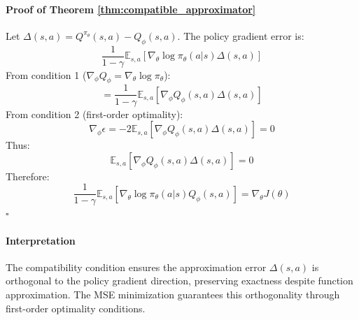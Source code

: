 \paragraph{Proof of Theorem \ref{thm:compatible_approximator}}  
Let \(\Delta(s,a) = Q^{\pi_\theta}(s,a) - Q_\phi(s,a)\). The policy gradient error is:
\[
\frac{1}{1-\gamma} \mathbb{E}_{s,a}[\nabla_\theta \log \pi_\theta(a|s) \Delta(s,a)]
\]
From condition 1 (\(\nabla_\phi Q_\phi = \nabla_\theta \log \pi_\theta\)):
\[
= \frac{1}{1-\gamma} \mathbb{E}_{s,a}[\nabla_\phi Q_\phi(s,a) \Delta(s,a)]
\]
From condition 2 (first-order optimality):
\[
\nabla_\phi \epsilon = -2 \mathbb{E}_{s,a}[\nabla_\phi Q_\phi(s,a) \Delta(s,a)] = 0
\]
Thus:
\[
\mathbb{E}_{s,a}[\nabla_\phi Q_\phi(s,a) \Delta(s,a)] = 0
\]
Therefore:
\[
\frac{1}{1-\gamma} \mathbb{E}_{s,a}[\nabla_\theta \log \pi_\theta(a|s) Q_\phi(s,a)] = \nabla_\theta J(\theta)
\]
\(\square\)

\paragraph{Interpretation} The compatibility condition ensures the approximation error \(\Delta(s,a)\) is orthogonal to the policy gradient direction, preserving exactness despite function approximation. The MSE minimization guarantees this orthogonality through first-order optimality conditions.
